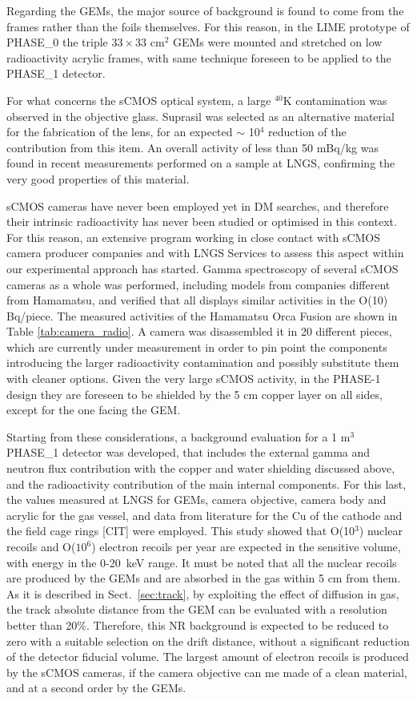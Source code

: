 \documentclass[physics,article,submit,moreauthors,pdftex]{Definitions/mdpi}
\begin{document}
Regarding the GEMs, the major source of background is found to come from the frames rather than the foils themselves. For this reason, in the LIME prototype of PHASE\_0 the triple $33 \times 33$ cm$^2$ GEMs were mounted and stretched on low radioactivity acrylic frames, with same technique foreseen to be applied to the PHASE\_1 detector. 

For what concerns the sCMOS optical system, a large $^{40}$K contamination was observed in the objective glass. Suprasil was selected as an alternative material for the fabrication of the lens, for an expected $\sim$ 10$^4$ reduction of the contribution from this item. An overall activity of less than 50 mBq/kg was found in recent measurements performed on a sample at LNGS, confirming the very good properties of this material.

sCMOS cameras have never been employed yet in DM searches, and therefore their intrinsic radioactivity has never been studied or optimised in this context. For this reason, an extensive program working in close contact with sCMOS camera producer companies and with LNGS Services to assess this aspect within our experimental approach has started. Gamma spectroscopy of several sCMOS cameras as a whole was performed, including models from companies different from Hamamatsu, and verified that all displays similar activities in the O(10) Bq/piece. The measured activities of the Hamamatsu Orca Fusion are shown in Table \ref{tab:camera_radio}. A camera was disassembled it in 20 different pieces, which are currently under measurement in order to pin point the components introducing the larger radioactivity contamination and possibly substitute them with cleaner options. Given the very large sCMOS activity, in the PHASE-1 design they are foreseen to be shielded by the 5 cm copper layer on all sides, except for the one facing the GEM.

Starting from these considerations, a background evaluation for a 1 m$^3$ PHASE\_1 detector was developed, that includes the external gamma and neutron flux contribution with the copper and water shielding discussed above, and the radioactivity contribution of the main internal components. For this last,  the values measured at LNGS for GEMs, camera objective, camera body and acrylic for the gas vessel, and data from literature for the Cu of the cathode and the field cage rings [CIT]  were employed. This study showed that O(10$^3$) nuclear recoils and O($10^6$) electron recoils per year are expected in the sensitive volume, with energy in the 0-20~keV range. It must be noted that all the nuclear recoils are produced by the GEMs and are absorbed in the gas within 5 cm from them. As it is described in Sect.~\ref{sec:track}, by exploiting the effect of diffusion in gas, the track absolute distance from the GEM can be evaluated with a resolution better than 20\%. Therefore, this NR background is expected to be reduced to zero with a suitable selection on the drift distance, without a significant reduction of the detector fiducial volume. The largest amount of electron recoils is produced by the sCMOS cameras, if the camera objective can me made of a clean material, and at a second order by the GEMs.
\end{document}

